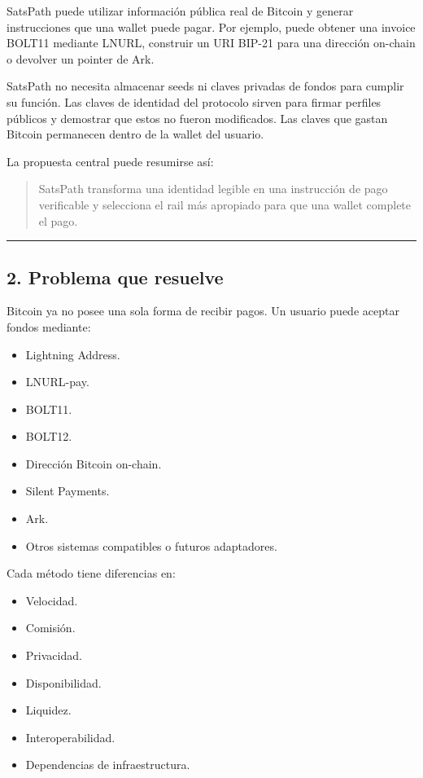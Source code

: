 \documentclass[
]{article}
\providecommand{\tightlist}{%
  \setlength{\itemsep}{0pt}\setlength{\parskip}{0pt}}
\begin{document}
SatsPath puede utilizar información pública real de Bitcoin y generar
instrucciones que una wallet puede pagar. Por ejemplo, puede obtener una
invoice BOLT11 mediante LNURL, construir un URI BIP-21 para una
dirección on-chain o devolver un pointer de Ark.

SatsPath no necesita almacenar seeds ni claves privadas de fondos para
cumplir su función. Las claves de identidad del protocolo sirven para
firmar perfiles públicos y demostrar que estos no fueron modificados.
Las claves que gastan Bitcoin permanecen dentro de la wallet del
usuario.

La propuesta central puede resumirse así:

\begin{quote}
SatsPath transforma una identidad legible en una instrucción de pago
verificable y selecciona el rail más apropiado para que una wallet
complete el pago.
\end{quote}

\begin{center}\rule{0.5\linewidth}{0.5pt}\end{center}

\hypertarget{problema-que-resuelve}{%
\subsection{2. Problema que resuelve}\label{problema-que-resuelve}}

Bitcoin ya no posee una sola forma de recibir pagos. Un usuario puede
aceptar fondos mediante:

\begin{itemize}
\tightlist
\item
  Lightning Address.
\item
  LNURL-pay.
\item
  BOLT11.
\item
  BOLT12.
\item
  Dirección Bitcoin on-chain.
\item
  Silent Payments.
\item
  Ark.
\item
  Otros sistemas compatibles o futuros adaptadores.
\end{itemize}

Cada método tiene diferencias en:

\begin{itemize}
\tightlist
\item
  Velocidad.
\item
  Comisión.
\item
  Privacidad.
\item
  Disponibilidad.
\item
  Liquidez.
\item
  Interoperabilidad.
\item
  Dependencias de infraestructura.
\end{itemize}
\end{document}
